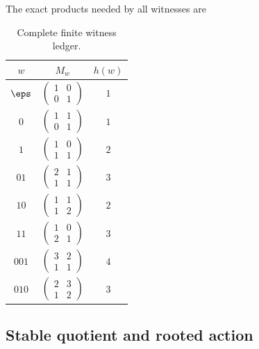 The exact products needed by all witnesses are
\begin{table}[H]
\centering
\caption{Complete finite witness ledger.}
\label{tab:exact-products}
\small
\begin{tabular}{@{}c c c@{}}
\toprule
$w$ & $M_w$ & $h(w)$ \\
\midrule
$\eps$ & $\left(\begin{smallmatrix}1&0\\0&1\end{smallmatrix}\right)$ & $1$ \\
$0$ & $\left(\begin{smallmatrix}1&1\\0&1\end{smallmatrix}\right)$ & $1$ \\
$1$ & $\left(\begin{smallmatrix}1&0\\1&1\end{smallmatrix}\right)$ & $2$ \\
$01$ & $\left(\begin{smallmatrix}2&1\\1&1\end{smallmatrix}\right)$ & $3$ \\
$10$ & $\left(\begin{smallmatrix}1&1\\1&2\end{smallmatrix}\right)$ & $2$ \\
$11$ & $\left(\begin{smallmatrix}1&0\\2&1\end{smallmatrix}\right)$ & $3$ \\
$001$ & $\left(\begin{smallmatrix}3&2\\1&1\end{smallmatrix}\right)$ & $4$ \\
$010$ & $\left(\begin{smallmatrix}2&3\\1&2\end{smallmatrix}\right)$ & $3$ \\
\bottomrule
\end{tabular}
\end{table}

\subsection{Stable quotient and rooted action}

